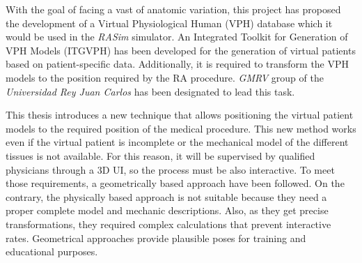 With the goal of facing a vast of anatomic variation, this project has proposed the development of a Virtual Physiological Human (VPH) database which it would be used in the \emph{RASim} simulator. An Integrated Toolkit for Generation of VPH Models (ITGVPH) has been developed for the generation of virtual patients based on patient-specific data. Additionally, it is required to transform the VPH models to the position required by the RA procedure. \emph{GMRV} group of the  \emph{Universidad Rey Juan Carlos} has been designated to lead this task.


This thesis introduces a new technique that allows positioning the virtual patient models to the required position of the medical procedure. This new method works even if the virtual patient is incomplete or the mechanical model of the different tissues is not available. For this reason, it will be supervised by qualified physicians through a 3D UI, so the process must be also interactive. To meet those requirements, a geometrically based approach have been followed. On the contrary, the physically based approach is not suitable because they need a proper complete model and mechanic descriptions. Also, as they get precise transformations, they required complex calculations that prevent interactive rates. Geometrical approaches provide plausible poses for training and educational purposes.

